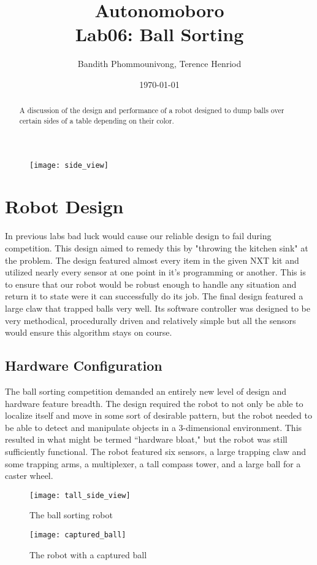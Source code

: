 \documentclass{article}
\title{Autonomoboro \\ Lab06: Ball Sorting}
\author{Bandith Phommounivong, Terence Henriod}
\date{\today}
\begin{document}
\maketitle

\begin{abstract}
A discussion of the design and performance of a robot designed to dump balls over certain sides of a table depending on their color.
\end{abstract}

  \begin{figure}[h!]
    \centering
    \texttt{[image: side\_view]}
    \label{fig:cover_pic}
  \end{figure}

\newpage
\section{Robot Design}
In previous labs bad luck would cause our reliable design to fail during competition. This design aimed to remedy this by "throwing the kitchen sink" at the problem. The design featured almost every item in the given NXT kit and utilized nearly every sensor at one point in it's programming or another. This is to ensure that our robot would be robust enough to handle any situation and return it to state were it can successfully do its job. The final design featured a large claw that trapped balls very well. Its software controller was designed to be very methodical, procedurally driven and relatively simple but all the sensors would ensure this algorithm stays on course. 

\subsection{Hardware Configuration}
The ball sorting competition demanded an entirely new level of design and hardware feature breadth. The design required the robot to not only be able to localize itself and move in some sort of desirable pattern, but the robot needed to be able to detect and manipulate objects in a 3-dimensional environment. This resulted in what might be termed ``hardware bloat," but the robot was still sufficiently functional. The robot featured six sensors, a large trapping claw and some trapping arms, a multiplexer, a tall compass tower, and a large ball for a caster wheel.

\begin{figure}[h!]
  \centering
  \begin{minipage}{.5\textwidth}
    \centering
    \texttt{[image: tall\_side\_view]}
    \caption{The ball sorting robot}
    \label{fig:ball_sorting_robot}
  \end{minipage}%
  \begin{minipage}{.5\textwidth}
    \centering
    \texttt{[image: captured\_ball]}
    \caption{The robot with a captured ball}
    \label{fig:captured_ball}
  \end{minipage}
\end{figure}
\end{document}
